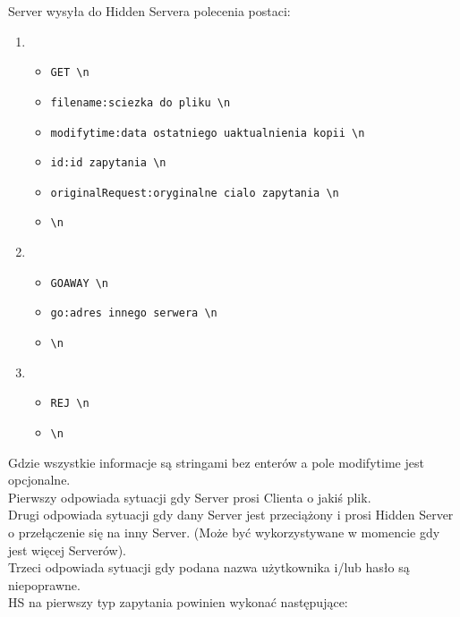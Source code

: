 \documentclass[a4paper,notitlepage]{article}
\begin{document}
Server wysyła do Hidden Servera polecenia postaci:
\begin{enumerate}
    \item
\begin{itemize}
    \item \texttt{GET \textbackslash n}
    \item \texttt{filename:sciezka do pliku \textbackslash n}
    \item \texttt{modifytime:data ostatniego uaktualnienia kopii \textbackslash n}
    \item \texttt{id:id zapytania \textbackslash n}
    \item \texttt{originalRequest:oryginalne cialo zapytania \textbackslash n}
    \item \texttt{\textbackslash n}
\end{itemize}
    \item
\begin{itemize}    
    \item \texttt{GOAWAY \textbackslash n}
    \item \texttt{go:adres innego serwera \textbackslash n}
    \item \texttt{\textbackslash n}
\end{itemize}
    \item
\begin{itemize}    
    \item \texttt{REJ \textbackslash n}
    \item \texttt{\textbackslash n}
\end{itemize}
\end{enumerate}
Gdzie wszystkie informacje są stringami bez enterów a pole modifytime jest opcjonalne. \\
Pierwszy odpowiada sytuacji gdy Server prosi Clienta o jakiś plik.\\ 
Drugi odpowiada sytuacji gdy dany Server jest przeciążony i prosi Hidden Server o przełączenie się na inny Server. (Może być wykorzystywane w momencie gdy jest więcej Serverów).\\
Trzeci odpowiada sytuacji gdy podana nazwa użytkownika i/lub hasło są niepoprawne.\\
HS na pierwszy typ zapytania powinien wykonać następujące:
\end{document}
